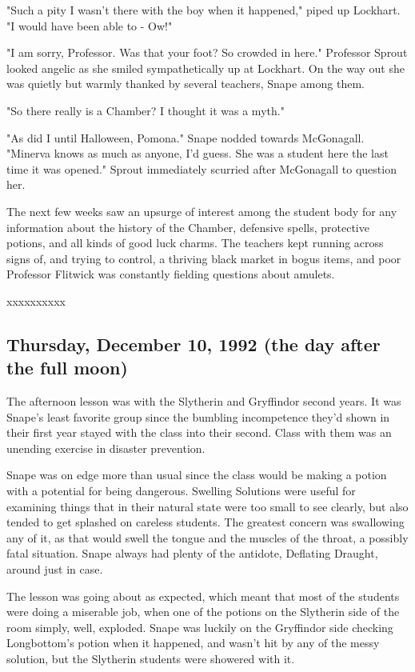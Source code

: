 \documentclass[a4paper,11pt]{article}
\begin{document}
"Such a pity I wasn't there with the boy when it happened," piped up Lockhart. "I would have been able to - Ow!"

"I am sorry, Professor. Was that your foot? So crowded in here." Professor Sprout looked angelic as she smiled sympathetically up at Lockhart. On the way out she was quietly but warmly thanked by several teachers, Snape among them.

"So there really is a Chamber? I thought it was a myth."

"As did I until Halloween, Pomona." Snape nodded towards McGonagall. "Minerva knows as much as anyone, I'd guess. She was a student here the last time it was opened." Sprout immediately scurried after McGonagall to question her.

The next few weeks saw an upsurge of interest among the student body for any information about the history of the Chamber, defensive spells, protective potions, and all kinds of good luck charms. The teachers kept running across signs of, and trying to control, a thriving black market in bogus items, and poor Professor Flitwick was constantly fielding questions about amulets.

xxxxxxxxxx

\subsection{Thursday, December 10, 1992 (the day after the full moon)}

The afternoon lesson was with the Slytherin and Gryffindor second years. It was Snape's least favorite group since the bumbling incompetence they'd shown in their first year stayed with the class into their second. Class with them was an unending exercise in disaster prevention.

Snape was on edge more than usual since the class would be making a potion with a potential for being dangerous. Swelling Solutions were useful for examining things that in their natural state were too small to see clearly, but also tended to get splashed on careless students. The greatest concern was swallowing any of it, as that would swell the tongue and the muscles of the throat, a possibly fatal situation. Snape always had plenty of the antidote, Deflating Draught, around just in case.

The lesson was going about as expected, which meant that most of the students were doing a miserable job, when one of the potions on the Slytherin side of the room simply, well, exploded. Snape was luckily on the Gryffindor side checking Longbottom's potion when it happened, and wasn't hit by any of the messy solution, but the Slytherin students were showered with it.
\end{document}
